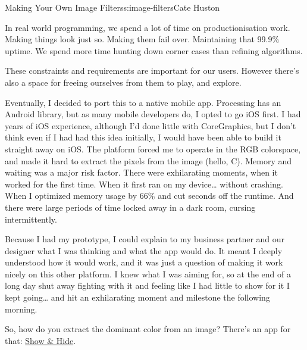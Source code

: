 \begin{aosachapter}{Making Your Own Image Filters}{s:image-filters}{Cate Huston}
\label{the-value-of-prototyping}

In real world programming, we spend a lot of time on productionisation
work. Making things look just so. Making them fail over. Maintaining
that 99.9\% uptime. We spend more time hunting down corner cases than
refining algorithms.

These constraints and requirements are important for our users. However
there's also a space for freeing ourselves from them to play, and
explore.

Eventually, I decided to port this to a native mobile app. Processing
has an Android library, but as many mobile developers do, I opted to go
iOS first. I had years of iOS experience, although I'd done little with
CoreGraphics, but I don't think even if I had had this idea initially, I
would have been able to build it straight away on iOS. The platform
forced me to operate in the RGB colorspace, and made it hard to extract
the pixels from the image (hello, C). Memory and waiting was a major
risk factor. There were exhilarating moments, when it worked for the
first time. When it first ran on my device\ldots{} without crashing.
When I optimized memory usage by 66\% and cut seconds off the runtime.
And there were large periods of time locked away in a dark room, cursing
intermittently.

Because I had my prototype, I could explain to my business partner and
our designer what I was thinking and what the app would do. It meant I
deeply understood how it would work, and it was just a question of
making it work nicely on this other platform. I knew what I was aiming
for, so at the end of a long day shut away fighting with it and feeling
like I had little to show for it I kept going\ldots{} and hit an
exhilarating moment and milestone the following morning.

So, how do you extract the dominant color from an image? There's an app
for that: \href{showandhide.com}{Show \& Hide}.

\end{aosachapter}
